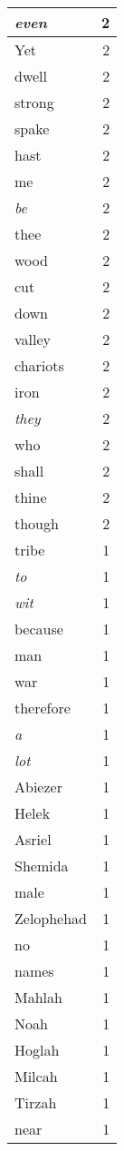 \begin{center}
\begin{longtable}{l|r}
\emph{even} & 2 \\ \hline
Yet & 2 \\ \hline
dwell & 2 \\ \hline
strong & 2 \\ \hline
spake & 2 \\ \hline
hast & 2 \\ \hline
me & 2 \\ \hline
\emph{be} & 2 \\ \hline
thee & 2 \\ \hline
wood & 2 \\ \hline
cut & 2 \\ \hline
down & 2 \\ \hline
valley & 2 \\ \hline
chariots & 2 \\ \hline
iron & 2 \\ \hline
\emph{they} & 2 \\ \hline
who & 2 \\ \hline
shall & 2 \\ \hline
thine & 2 \\ \hline
though & 2 \\ \hline
tribe & 1 \\ \hline
\emph{to} & 1 \\ \hline
\emph{wit} & 1 \\ \hline
because & 1 \\ \hline
man & 1 \\ \hline
war & 1 \\ \hline
therefore & 1 \\ \hline
\emph{a} & 1 \\ \hline
\emph{lot} & 1 \\ \hline
Abiezer & 1 \\ \hline
Helek & 1 \\ \hline
Asriel & 1 \\ \hline
Shemida & 1 \\ \hline
male & 1 \\ \hline
Zelophehad & 1 \\ \hline
no & 1 \\ \hline
names & 1 \\ \hline
Mahlah & 1 \\ \hline
Noah & 1 \\ \hline
Hoglah & 1 \\ \hline
Milcah & 1 \\ \hline
Tirzah & 1 \\ \hline
near & 1 \\ \hline

\end{longtable}
\end{center}

